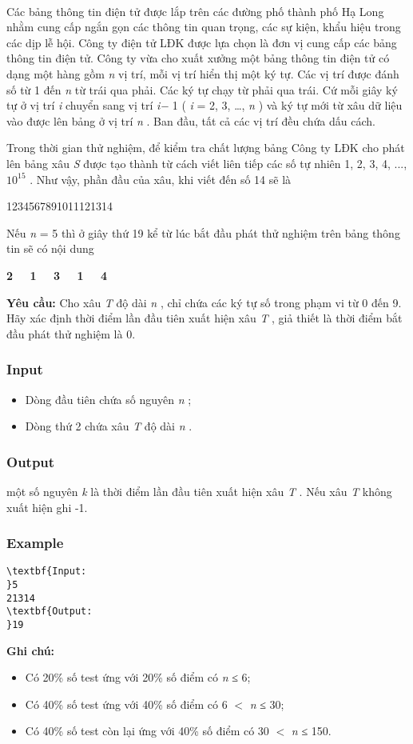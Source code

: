 

 

Các bảng thông tin điện tử được lắp trên các đường phố thành phố Hạ Long nhằm cung cấp ngắn gọn các thông tin quan trọng, các sự kiện, khẩu hiệu trong các dịp lễ hội. Công ty điện tử LĐK được lựa chọn là đơn vị cung cấp các bảng thông tin điện tử. Công ty vừa cho xuất xưởng một bảng thông tin điện tử có dạng một hàng gồm \emph{ n } vị trí, mỗi vị trí hiển thị một ký tự. Các vị trí được đánh số từ 1 đến \emph{ n } từ trái qua phải. Các ký tự chạy từ phải qua trái. Cứ mỗi giây ký tự ở vị trí \emph{ i } chuyển sang vị trí \emph{ i− } 1 ( \emph{ i } = 2, 3, …, \emph{ n } ) và ký tự mới từ xâu dữ liệu vào được lên bảng ở vị trí \emph{ n } . Ban đầu, tất cả các vị trí đều chứa dấu cách.

Trong thời gian thử nghiệm, để kiểm tra chất lượng bảng Công ty LĐK cho phát lên bảng xâu \emph{ S } được tạo thành từ cách viết liên tiếp các số tự nhiên 1, 2, 3, 4, ..., $10^{15}$ . Như vậy, phần đầu của xâu, khi viết đến số 14 sẽ là

1234567891011121314

Nếu \emph{ n } = 5 thì ở giây thứ 19 kể từ lúc bắt đầu phát thử nghiệm trên bảng thông tin sẽ có nội dung

\textbf{2   1   3   1   4 }

\textbf{Yêu cầu: } Cho xâu \emph{ T } độ dài \emph{ n } , chỉ chứa các ký tự số trong phạm vi từ 0 đến 9. Hãy xác định thời điểm lần đầu tiên xuất hiện xâu \emph{ T } , giả thiết là thời điểm bắt đầu phát thử nghiệm là 0.

\subsubsection{Input}
\begin{itemize}
	\item Dòng đầu tiên chứa số nguyên \emph{ n } ;
	\item Dòng thứ 2 chứa xâu \emph{ T } độ dài \emph{ n } .
\end{itemize}

\subsubsection{Output}

một số nguyên \emph{ k } là thời điểm lần đầu tiên xuất hiện xâu \emph{ T } . Nếu xâu \emph{ T } không xuất hiện ghi -1.

\subsubsection{Example}
\begin{verbatim}
\textbf{Input:
}5
21314
\textbf{Output:
}19 
\end{verbatim}

\textbf{\textbf{Ghi chú:}}
\begin{itemize}
	\item Có 20\% số test ứng với 20\% số điểm có \emph{n }≤ 6;
	\item Có 40\% số test ứng với 40\% số điểm có 6 $<$ \emph{n} ≤ 30;
	\item Có 40\% số test còn lại ứng với 40\% số điểm có 30 $<$ \emph{n} ≤ 150.
\end{itemize}
